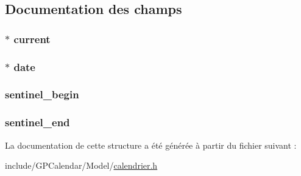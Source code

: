 \subsection{Documentation des champs}
\hypertarget{struct_list_rendez_vous_af4abed97401227a9dc25377d0840dd36}{
\subsubsection[{current}]{$\ast$ current}}\label{struct_list_rendez_vous_af4abed97401227a9dc25377d0840dd36}
\hypertarget{struct_list_rendez_vous_a73fc78564c9badbcea68f2f2331c74db}{
\subsubsection[{date}]{$\ast$ date}}\label{struct_list_rendez_vous_a73fc78564c9badbcea68f2f2331c74db}
\hypertarget{struct_list_rendez_vous_a557d4ad3f27cc277dbd188dd7edc897c}{
\subsubsection[{sentinel\-\_\-begin}]{ sentinel\-\_\-begin}}\label{struct_list_rendez_vous_a557d4ad3f27cc277dbd188dd7edc897c}
\hypertarget{struct_list_rendez_vous_a23ecc58b8762108d2cdf8d71b1848178}{
\subsubsection[{sentinel\-\_\-end}]{ sentinel\-\_\-end}}\label{struct_list_rendez_vous_a23ecc58b8762108d2cdf8d71b1848178}


La documentation de cette structure a été générée à partir du fichier suivant \-:\begin{DoxyCompactItemize}
\item 
include/\-G\-P\-Calendar/\-Model/\hyperlink{calendrier_8h}{calendrier.\-h}\end{DoxyCompactItemize}
